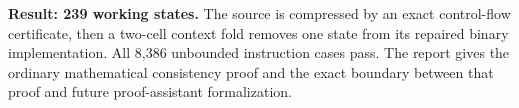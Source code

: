 \begin{minipage}{\textwidth}
\color{navy}\textbf{Result: 239 working states.}
The source is compressed by an exact control-flow certificate, then a
two-cell context fold removes one state from its repaired binary
implementation.  All 8,386 unbounded instruction cases pass.  The report
gives the ordinary mathematical consistency proof and the exact boundary
between that proof and future proof-assistant formalization.
\end{minipage}
